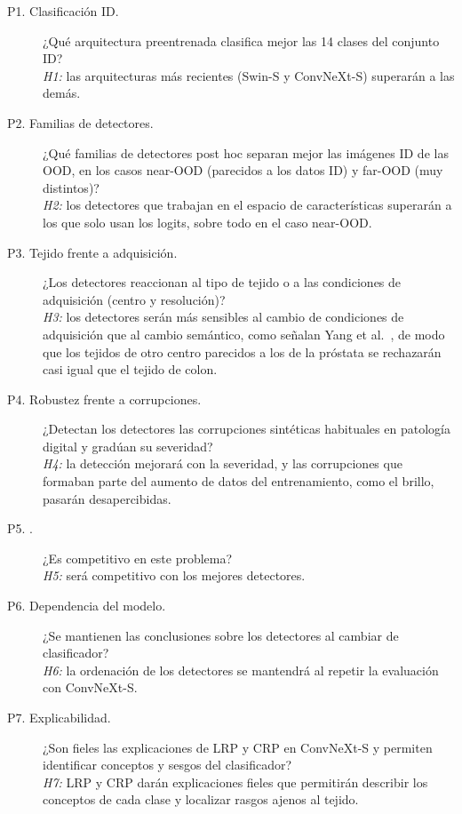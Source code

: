 \begin{description}
  \item[P1. Clasificación ID.] ¿Qué arquitectura preentrenada clasifica mejor las 14 clases del conjunto ID?\\
    \emph{H1:} las arquitecturas más recientes (Swin-S y ConvNeXt-S) superarán a las demás.
  \item[P2. Familias de detectores.] ¿Qué familias de detectores post hoc separan mejor las imágenes ID de las OOD, en los casos near-OOD (parecidos a los datos ID) y far-OOD (muy distintos)?\\
    \emph{H2:} los detectores que trabajan en el espacio de características superarán a los que solo usan los logits, sobre todo en el caso near-OOD.
  \item[P3. Tejido frente a adquisición.] ¿Los detectores reaccionan al tipo de tejido o a las condiciones de adquisición (centro y resolución)?\\
    \emph{H3:} los detectores serán más sensibles al cambio de condiciones de adquisición que al cambio semántico, como señalan Yang et al.~\cite{yang2024}, de modo que los tejidos de otro centro parecidos a los de la próstata se rechazarán casi igual que el tejido de colon.
  \item[P4. Robustez frente a corrupciones.] ¿Detectan los detectores las corrupciones sintéticas habituales en patología digital y gradúan su severidad?\\
    \emph{H4:} la detección mejorará con la severidad, y las corrupciones que formaban parte del aumento de datos del entrenamiento, como el brillo, pasarán desapercibidas.
  \item[P5. \stoodx.] ¿Es \stoodx competitivo en este problema?\\
    \emph{H5:} \stoodx será competitivo con los mejores detectores.
  \item[P6. Dependencia del modelo.] ¿Se mantienen las conclusiones sobre los detectores al cambiar de clasificador?\\
    \emph{H6:} la ordenación de los detectores se mantendrá al repetir la evaluación con ConvNeXt-S.
  \item[P7. Explicabilidad.] ¿Son fieles las explicaciones de LRP y CRP en ConvNeXt-S y permiten identificar conceptos y sesgos del clasificador?\\
    \emph{H7:} LRP y CRP darán explicaciones fieles que permitirán describir los conceptos de cada clase y localizar rasgos ajenos al tejido.
\end{description}

